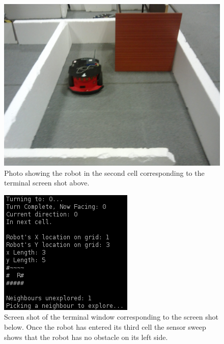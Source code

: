 \documentclass[a4paper,12pt]{article}
\begin{document}
\begin{figure}[H]
\includegraphics[scale=0.13]{RealS2.jpg}
\caption{Photo showing the robot in the second cell corresponding to the terminal screen shot above.}
\end{figure}

\begin{figure}[H]
\includegraphics[scale=1.0]{RealRunT3.png}
\caption{Screen shot of the terminal window corresponding to the screen shot below. Once the robot has entered its third cell the sensor sweep shows that the robot has no obstacle on its left side.}
\end{figure}
\end{document}
